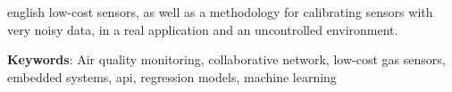 \begin{resumo}[Abstract]
\begin{otherlanguage*}{english}
low-cost sensors, as well as a methodology for calibrating sensors with very noisy data, in a real application and an uncontrolled environment.

		\textbf{Keywords}: Air quality monitoring, collaborative network, low-cost gas sensors, embedded systems, \acrshort{api}, regression models, machine learning
	\end{otherlanguage*}
\end{resumo}

{%
	\hypersetup{hidelinks}
	\listoffigures*
	\cleardoublepage
	
	\listoftables*
	\cleardoublepage
	
	
	\printglossary[title=Lista de Siglas, toctitle=Lista de siglas]
    \printglossary[type=\acronymtype,title=Lista de Símbolos, toctitle=Lista de símbolos]

	\tableofcontents*
	\cleardoublepage
	
}%
